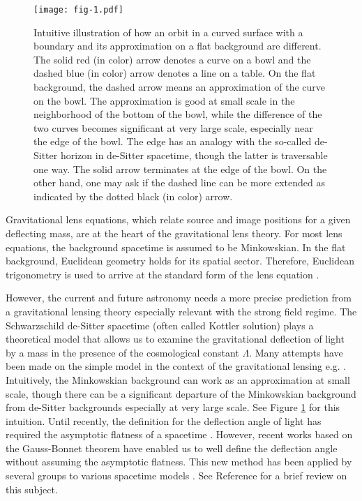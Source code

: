\documentclass[twocolumn,showpacs,preprintnumbers,amsmath,amssymb]{revtex4-1}
\begin{document}
\begin{figure}
\texttt{[image: fig-1.pdf]}
\caption{
Intuitive illustration of 
how an orbit in a curved surface with a boundary 
and its approximation on a flat background are different. 
The solid red (in color) arrow denotes a curve on a bowl 
and the dashed blue (in color) arrow denotes a line on a table. 
On the flat background, the dashed arrow 
means an approximation of the curve on the bowl. 
The approximation is good at small scale 
in the neighborhood of the bottom of the bowl, 
while the difference of the two curves becomes significant 
at very large scale, especially near the edge of the bowl. 
The edge has an analogy with 
the so-called de-Sitter horizon in de-Sitter spacetime, 
though the latter is traversable one way. 
The solid arrow terminates at the edge of the bowl. 
On the other hand, one may ask if the dashed line 
can be more extended as indicated by the dotted black (in color) arrow. 
}
\label{fig-idea}
\end{figure}




Gravitational lens equations, 
which relate source and image positions 
for a given deflecting mass, 
are at the heart of the gravitational lens theory. 
For most lens equations, 
the background spacetime is assumed to be Minkowskian. 
In the flat background, Euclidean geometry holds for its spatial sector. 
Therefore, Euclidean trigonometry is used to arrive at 
the standard form of the lens equation \cite{SEF, Petters, Dodelson, Keeton}. 

However, the current and future astronomy needs a more precise prediction 
from a gravitational lensing theory especially relevant with the strong field regime. 
The Schwarzschild de-Sitter spacetime (often called Kottler solution) 
plays a theoretical model that allows us to examine the gravitational deflection 
of light by a mass in the presence of the cosmological constant $\Lambda$. 
Many attempts have been made on the simple model 
in the context of the gravitational lensing e.g. 
\cite{Lake,RI,Finelli,Park,Sereno,Bhadra,Simpson,AK,Ishihara2016,Piattella,Butcher,LW,AB,Arakida2021,LLJ}. 
Intuitively, the Minkowskian background can work as an approximation at small scale, 
though there can be a significant departure of the Minkowskian background 
from de-Sitter backgrounds especially at very large scale. 
See Figure \ref{fig-idea} for this intuition. 
Until recently, the definition for the deflection angle of light has required 
the asymptotic flatness of a spacetime 
\cite{SEF, Petters, Dodelson, Keeton}. 
However, recent works 
\cite{Ishihara2016, Takizawa2020a} 
based on the Gauss-Bonnet theorem 
\cite{GW} 
have enabled us to well define the deflection angle 
without assuming the asymptotic flatness. 
This new method has been applied by several groups to various spacetime models 
\cite{Ishihara2017, Jusufi2017a, Jusufi2017b, Jusufi2018, Ovgun2019, Ovgun2020, Crisnejo2018, Crisnejo2019, Ono2017, Ono2018, Ono2019}. 
See Reference \cite{Ono2019b} for a brief review on this subject. 
\end{document}
